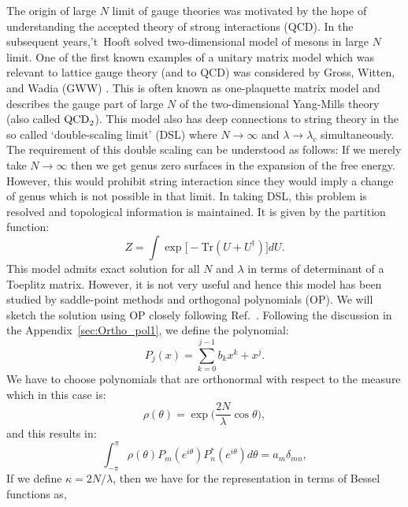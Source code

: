 \documentclass[letter,11pt]{article}
\begin{document}
The origin of large $N$ limit of gauge theories was motivated by the hope of understanding 
the accepted theory of strong interactions (QCD). 
In the subsequent years,'t~Hooft solved two-dimensional model of mesons in large $N$ 
limit. One of the first known examples of a unitary matrix model which was relevant to 
lattice gauge theory (and to QCD) was considered by Gross, Witten, and 
Wadia (GWW) \cite{Gross:1980he, Wadia:2012fr}.
This is often known as one-plaquette matrix model and describes 
the gauge part of large $N$ of the two-dimensional Yang-Mills theory (also called $\rm{QCD}_{2}$).
This model also has deep connections to string theory in the so 
called `double-scaling limit' (DSL) where $N \to \infty$ and $\lambda \to \lambda_{c}$ 
simultaneously. The requirement of this double scaling can be understood as follows: 
If we merely take $N \to \infty$ then we get genus zero surfaces in the 
expansion of the free energy. However, this would prohibit string interaction 
since they would imply a change of genus which is not possible in that limit. 
In taking DSL, this problem is resolved and topological information is maintained. 
It is given by the partition function: 
\begin{equation}
	Z = \int \exp \Big[- \mbox{Tr} (U + U^{\dagger})   \Big] dU. 
\end{equation}
This model admits exact solution for all $N$ and $\lambda$ in terms of determinant of a 
Toeplitz matrix. However, it is not very useful and hence this model has been studied by 
saddle-point methods and orthogonal polynomials (OP). We will sketch the solution using OP 
closely following Ref.~\cite{Goldschmidt:1979hq}. 
Following the discussion in the Appendix~\ref{sec:Ortho_pol1}, we define the polynomial:
\begin{equation}
	P_{j}(x) = \sum_{k=0}^{j-1} b_{k} x^{k} + x^{j}. 
\end{equation} 
We have to choose polynomials that are orthonormal with respect to the measure which in this case is:
\begin{equation}
	\rho(\theta) = \exp\Big(\frac{2N}{\lambda} \cos \theta \Big),
\end{equation}
and this results in:
\begin{equation}
	\int_{-\pi}^{\pi} \rho(\theta) P_{m}(e^{i\theta}) P_{n}^{*}(e^{i\theta}) d\theta= a_{m} \delta_{mn},
\end{equation}
If we define $\kappa = 2N/\lambda$, then we have for the representation in terms of 
Bessel functions as, 
\end{document}
